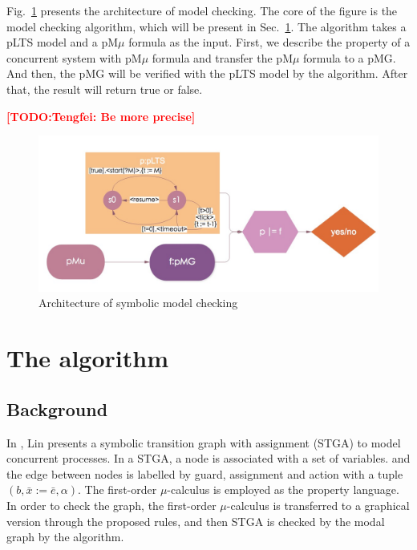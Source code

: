 \documentclass[runningheads,a4paper]{llncs}
\newcommand{\TODO}[1]{\textcolor{red}{\textbf{[TODO:#1]}}}
\begin{document}
Fig.~\ref{architectrue} presents the architecture of model checking. The core of the figure is the model checking algorithm, which will be present in Sec.~\ref{algorithm}. The algorithm takes a pLTS model and a pM$\mu$ formula as the input. First, we describe the property of a concurrent system with pM$\mu$ formula and transfer the pM$\mu$ formula to a pMG. And then, the pMG will be verified with the pLTS model by the algorithm. After that, the result will return true or false.

\TODO{Tengfei: Be more precise}


\begin{figure}
    \centering\includegraphics[width=5.5in]{figures/architectrue.jpeg} 
    \caption{Architecture of symbolic model checking}
    \label{architectrue}
\end{figure}






\section{The algorithm}\label{algorithm}

\subsection{Background}

 In \cite{lin1996stga}, Lin presents a symbolic transition graph with assignment (STGA) to model concurrent processes. In a STGA, a node is associated with a set of variables. and the edge between nodes is labelled by guard, assignment and action with a tuple $(b, \bar{x}:=\bar{e}, \alpha)$. The first-order $\mu$-calculus is employed as the property language. In order to check the graph, the first-order $\mu$-calculus is transferred to a graphical version through the proposed rules, and then STGA is checked by the modal graph by the algorithm.
 
\end{document}
